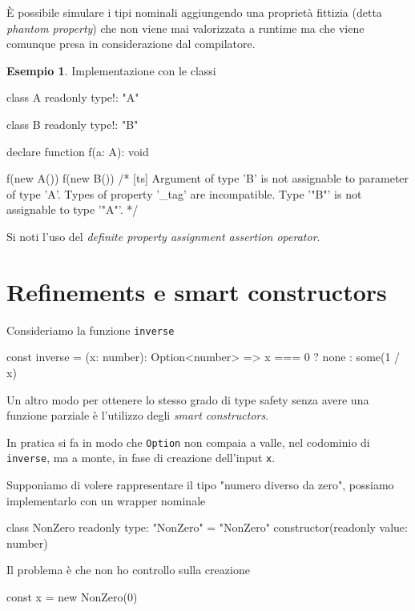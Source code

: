 \documentclass[12pt]{article}
\theoremstyle{definition}
\newtheorem{example}{Esempio}[subsection]
\newenvironment{code}
  {\vspace{0.5cm} \VerbatimEnvironment\begin{typescriptcode}}
  {\end{typescriptcode} \vspace{0.2cm}}
\begin{document}
È possibile simulare i tipi nominali aggiungendo una proprietà fittizia (detta \emph{phantom property}) che non viene mai valorizzata
a runtime ma che viene comunque presa in considerazione dal compilatore.

\begin{example}
Implementazione con le classi

\begin{code}
class A {
  readonly type!: "A"
}

class B {
  readonly type!: "B"
}

declare function f(a: A): void

f(new A())
f(new B())
/*
[ts]
Argument of type 'B' is not assignable to parameter of type 'A'.
  Types of property '_tag' are incompatible.
    Type '"B"' is not assignable to type '"A"'.
*/
\end{code}
\end{example}

Si noti l'uso del \emph{definite property assignment assertion operator}.

\newpage
\section{Refinements e smart constructors}

Consideriamo la funzione \texttt{inverse}

\begin{code}
const inverse = (x: number): Option<number> =>
  x === 0 ? none : some(1 / x)
\end{code}

Un altro modo per ottenere lo stesso grado di type safety senza avere una funzione parziale è l'utilizzo degli \emph{smart constructors}.

In pratica si fa in modo che \texttt{Option} non compaia a valle, nel codominio di \texttt{inverse},
ma a monte, in fase di creazione dell'input \texttt{x}.

Supponiamo di volere rappresentare il tipo "numero diverso da zero", possiamo implementarlo con un wrapper nominale

\begin{code}
class NonZero {
  readonly type: "NonZero" = "NonZero"
  constructor(readonly value: number) {}
}
\end{code}

Il problema è che non ho controllo sulla creazione

\begin{code}
const x = new NonZero(0)
\end{code}
\end{document}

